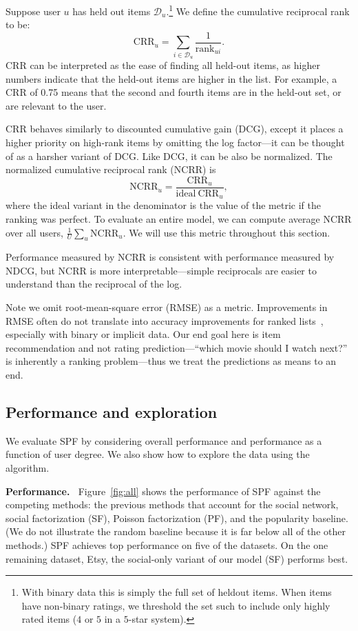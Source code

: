 \documentclass{sig-alternate-2013}
\newcommand{\mypar}[1]{\vspace{0.05in} \noindent \textbf{#1 \,}}
\begin{document}
Suppose user $u$ has held out items $\mathcal{D}_u$.\footnote{With
  binary data this is simply the full set of heldout items. When items
  have non-binary ratings, we threshold the set such to include only
  highly rated items ($4$ or $5$ in a $5$-star system).} We define the
cumulative reciprocal rank to be:
\[\textrm{CRR}_u = \sum_{i \in\mathcal{D}_u} \frac{1}{\mbox{rank}_{ui}}.\]
CRR can be interpreted as the ease of finding all held-out items, as
higher numbers indicate that the held-out items are higher in the
list.  For example, a CRR of 0.75 means that the second and fourth items
are in the held-out set, or are relevant to the user.

CRR behaves similarly to discounted cumulative gain (DCG), except it
places a higher priority on high-rank items by omitting the log
factor---it can be thought of as a harsher variant of DCG.  Like DCG,
it can be also be normalized.  The normalized cumulative reciprocal
rank (NCRR) is
\[\textrm{NCRR}_u = \frac{\textrm{CRR}_u}{\mbox{ideal}~\textrm{CRR}_u},\]
where the ideal variant in the denominator is the value of the metric
if the ranking was perfect.  To evaluate an entire model, we can
compute average NCRR over all users,
$\frac{1}{U}\sum_u \textrm{NCRR}_u$.  We will use this metric
throughout this section.


Performance measured by NCRR is consistent with performance measured
by NDCG, but NCRR is more interpretable---simple reciprocals are easier
to understand than the reciprocal of the log.

Note we omit root-mean-square error (RMSE) as a metric. Improvements
in RMSE often do not translate into accuracy improvements for ranked
lists~\cite{Amatriain:2012:WRU:2365952.2366042,topN,Loiacono:2014,Singh:2014},
especially with binary or implicit data.  Our end goal here is item
recommendation and not rating prediction---``which movie should I
watch next?'' is inherently a ranking problem---thus we treat the
predictions as means to an end.

\subsection{Performance and exploration}

We evaluate SPF by considering overall performance and performance as
a function of user degree.  We also show how to explore the data using the algorithm.

\mypar{Performance.} Figure~\ref{fig:all} shows the performance of SPF against the
competing methods: the previous methods that account for the
social network, social factorization (SF), Poisson factorization (PF),
and the popularity baseline.  (We do not illustrate the random baseline because it is
far below all of the other methods.)  SPF achieves top performance on
five of the datasets.  On the one remaining dataset, Etsy, the
social-only variant of our model (SF) performs best.
\end{document}
